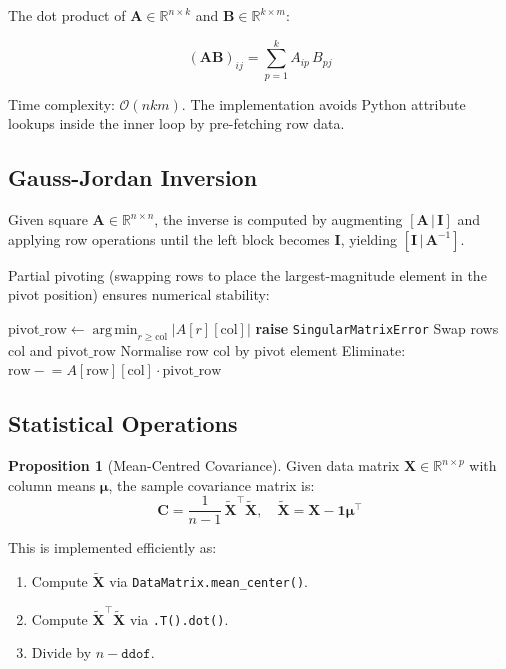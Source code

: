 \documentclass[12pt,a4paper]{report}
\DeclareMathOperator*{\argmin}{arg\,min}
\newcommand{\R}{\mathbb{R}}
\newcommand{\mat}[1]{\mathbf{#1}}
\newcommand{\vect}[1]{\bm{#1}}
\theoremstyle{definition}
\newtheorem{proposition}{Proposition}[chapter]
\begin{document}
The dot product of $\mat{A} \in \R^{n \times k}$ and $\mat{B} \in \R^{k \times m}$:

\[
  (\mat{A}\mat{B})_{ij} = \sum_{p=1}^{k} A_{ip}\, B_{pj}
\]

Time complexity: $\mathcal{O}(nkm)$. The implementation avoids Python attribute
lookups inside the inner loop by pre-fetching row data.

\subsection{Gauss-Jordan Inversion}

Given square $\mat{A} \in \R^{n \times n}$, the inverse is computed by
augmenting $[\mat{A}\,|\,\mat{I}]$ and applying row operations until the left
block becomes $\mat{I}$, yielding $[\mat{I}\,|\,\mat{A}^{-1}]$.

Partial pivoting (swapping rows to place the largest-magnitude element in the
pivot position) ensures numerical stability:

\begin{algorithm}[H]
\caption{Gauss-Jordan with Partial Pivoting}
\begin{algorithmic}[1]
  \State $\text{pivot\_row} \gets \argmin_{r \geq \text{col}} |A[r][\text{col}]|$
    \State \textbf{raise} \texttt{SingularMatrixError}
  \EndIf
  \State Swap rows $\text{col}$ and $\text{pivot\_row}$
  \State Normalise row $\text{col}$ by pivot element
    \State Eliminate: $\text{row} \mathrel{-}= A[\text{row}][\text{col}] \cdot \text{pivot\_row}$
  \EndFor
\EndFor
\end{algorithmic}
\end{algorithm}

\subsection{Statistical Operations}

\begin{proposition}[Mean-Centred Covariance]
Given data matrix $\mat{X} \in \R^{n \times p}$ with column means $\vect{\mu}$,
the sample covariance matrix is:
\[
  \mat{C} = \frac{1}{n-1}\,\tilde{\mat{X}}^\top \tilde{\mat{X}}, \quad
  \tilde{\mat{X}} = \mat{X} - \mathbf{1}\vect{\mu}^\top
\]
\end{proposition}

This is implemented efficiently as:
\begin{enumerate}
  \item Compute $\tilde{\mat{X}}$ via \texttt{DataMatrix.mean\_center()}.
  \item Compute $\tilde{\mat{X}}^\top\tilde{\mat{X}}$ via \texttt{.T().dot()}.
  \item Divide by $n - \texttt{ddof}$.
\end{enumerate}
\end{document}
